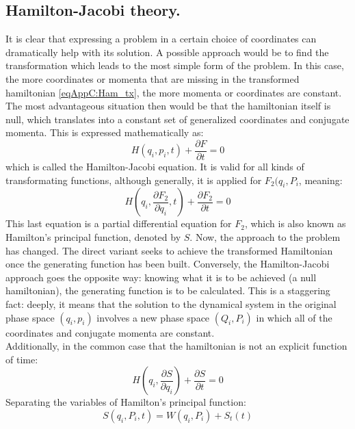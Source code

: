 	\subsection{Hamilton-Jacobi theory.}
	\indent It is clear that expressing a problem in a certain choice of coordinates can dramatically help with its solution. A possible approach would be to find the transformation which leads to the most simple form of the problem. In this case, the more coordinates or momenta that are missing in the transformed hamiltonian \eqref{eqAppC:Ham_tx}, the more momenta or coordinates are constant. The most advantageous situation then would be that the hamiltonian itself is null, which translates into a constant set of generalized coordinates and conjugate momenta. This is expressed mathematically as:
	\begin{equation}
	H(q_i, p_i, t) + \dfrac{\partial F}{\partial t} = 0
	\label{eqAppC:HJ_eq}
	\end{equation}
	\noindent which is called the Hamilton-Jacobi equation. It is valid for all kinds of transformating functions, although generally, it is applied for $F_2(q_i, P_i$, meaning:
	\begin{equation}
	H\left(q_i, \dfrac{\partial F_2}{\partial q_i}, t\right) + \dfrac{\partial F_2}{\partial t} = 0
	\end{equation}
	\indent This last equation is a partial differential equation for $F_2$, which is also known as Hamilton's principal function, denoted by $S$. Now, the approach to the problem has changed. The direct variant seeks to achieve the transformed Hamiltonian once the generating function has been built. Conversely, the Hamilton-Jacobi approach goes the opposite way: knowing what it is to be achieved (a null hamiltonian), the generating function is to be calculated. This is a staggering fact: deeply, it means that the solution to the dynamical system in the original phase space $(q_i, p_i)$ involves a new phase space $(Q_i, P_i)$ in which all of the coordinates and conjugate momenta are constant. \\
	\indent Additionally, in the common case that the hamiltonian is not an explicit function of time:
	\begin{equation}
	H\left(q_i, \dfrac{\partial S}{\partial q_i}\right) + \dfrac{\partial S}{\partial t} = 0
	\label{eqAppC:HJ_2}
	\end{equation}
	\indent Separating the variables of Hamilton's principal function:
	\begin{equation}
	S(q_i, P_i, t ) = W(q_i, P_i) + S_t(t)
	\label{eqAppC:HJ_3}	
	\end{equation}
